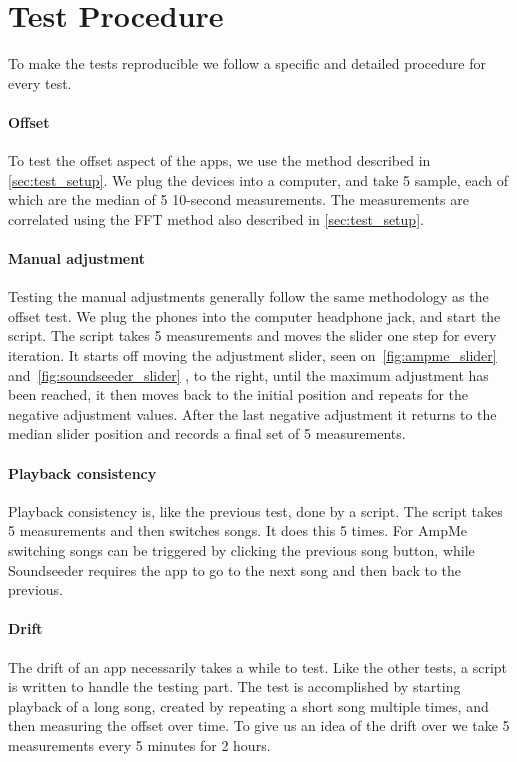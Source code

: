 \section{Test Procedure}\label{sec:test_procedure}
To make the tests reproducible we follow a specific and detailed
procedure for every test.

\paragraph{Offset}
To test the offset aspect of the apps, we use the method described in
\cref{sec:test_setup}. We plug the devices into a computer, and take
5 sample, each of which are the median of 5 10-second measurements. The
measurements are correlated using the \ac{FFT} method also described in
\cref{sec:test_setup}.

\paragraph{Manual adjustment}
Testing the manual adjustments generally follow the same methodology as
the offset test. We plug the phones into the computer headphone jack,
and start the script. The script takes 5 measurements and moves the
slider one step for every iteration. It starts off moving the adjustment
slider, seen on~\vref{fig:ampme_slider} and~\vref{fig:soundseeder_slider}
, to the right, until the maximum adjustment has
been reached, it then moves back to the initial position and repeats for
the negative adjustment values. After the last negative adjustment it
returns to the median slider position and records a final set of
5 measurements.

\paragraph{Playback consistency}
Playback consistency is, like the previous test, done by a script. The
script takes 5 measurements and then switches songs. It does this
5 times. For AmpMe switching songs can be triggered by clicking the
previous song button, while Soundseeder requires the app to go to the
next song and then back to the previous.

\paragraph{Drift}
The drift of an app necessarily takes a while to test. Like the other
tests, a script is written to handle the testing part. The test is
accomplished by starting playback of a long song, created by repeating
a short song multiple times, and then measuring the offset over time. To
give us an idea of the drift over we take 5 measurements every 5 minutes
for 2 hours.
